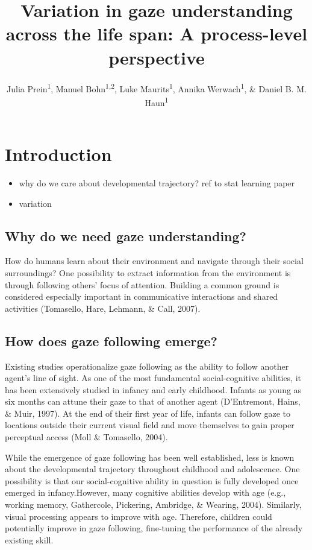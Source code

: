 \documentclass[
  man,floatsintext]{apa6}
\title{Variation in gaze understanding across the life span: A process-level perspective}
\author{Julia Prein\textsuperscript{1}, Manuel Bohn\textsuperscript{1,2}, Luke Maurits\textsuperscript{1}, Annika Werwach\textsuperscript{1}, \& Daniel B. M. Haun\textsuperscript{1}}
\date{}
\affiliation{\vspace{0.5cm}\textsuperscript{1} Department of Comparative Cultural Psychology, Max Planck Institute for Evolutionary Anthropology, Leipzig, Germany\\\textsuperscript{2} Institute of Psychology, Leuphana University Lüneburg, Germany}
\providecommand{\tightlist}{%
  \setlength{\itemsep}{0pt}\setlength{\parskip}{0pt}}
\begin{document}
\maketitle

\hypertarget{introduction}{%
\section{Introduction}\label{introduction}}

\begin{itemize}
\tightlist
\item
  why do we care about developmental trajectory? ref to stat learning paper
\item
  variation
\end{itemize}

\hypertarget{why-do-we-need-gaze-understanding}{%
\subsection{Why do we need gaze understanding?}\label{why-do-we-need-gaze-understanding}}

How do humans learn about their environment and navigate through their social surroundings?
One possibility to extract information from the environment is through following others' focus of attention.
Building a common ground is considered especially important in communicative interactions and shared activities (Tomasello, Hare, Lehmann, \& Call, 2007).

\hypertarget{how-does-gaze-following-emerge}{%
\subsection{How does gaze following emerge?}\label{how-does-gaze-following-emerge}}

Existing studies operationalize gaze following as the ability to follow another agent's line of sight.
As one of the most fundamental social-cognitive abilities, it has been extensively studied in infancy and early childhood.
Infants as young as six months can attune their gaze to that of another agent (D'Entremont, Hains, \& Muir, 1997).
At the end of their first year of life, infants can follow gaze to locations outside their current visual field and move themselves to gain proper perceptual access (Moll \& Tomasello, 2004).

While the emergence of gaze following has been well established, less is known about the developmental trajectory throughout childhood and adolescence.
One possibility is that our social-cognitive ability in question is fully developed once emerged in infancy.However, many cognitive abilities develop with age (e.g., working memory, Gathercole, Pickering, Ambridge, \& Wearing, 2004).
Similarly, visual processing appears to improve with age.
Therefore, children could potentially improve in gaze following, fine-tuning the performance of the already existing skill.
\end{document}
